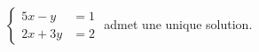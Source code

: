 $\begin{cases}5x-y &= 1 \\ 2x+3y &= 2\end{cases}$ admet une unique solution.

\begin{reponses}
\end{reponses}


